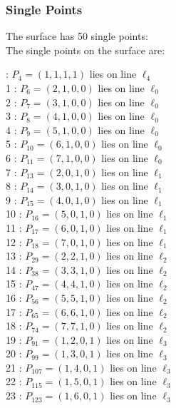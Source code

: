 \documentclass{article}
\begin{document}
{\subsubsection*{Single Points}
The surface has 50 single points:\\
The single points on the surface are:\\
\begin{multicols}{2}
 : $P_{4}=( 1, 1, 1, 1 )$ lies on line $\ell_{4}$\\
1 : $P_{6}=( 2, 1, 0, 0 )$ lies on line $\ell_{0}$\\
2 : $P_{7}=( 3, 1, 0, 0 )$ lies on line $\ell_{0}$\\
3 : $P_{8}=( 4, 1, 0, 0 )$ lies on line $\ell_{0}$\\
4 : $P_{9}=( 5, 1, 0, 0 )$ lies on line $\ell_{0}$\\
5 : $P_{10}=( 6, 1, 0, 0 )$ lies on line $\ell_{0}$\\
6 : $P_{11}=( 7, 1, 0, 0 )$ lies on line $\ell_{0}$\\
7 : $P_{13}=( 2, 0, 1, 0 )$ lies on line $\ell_{1}$\\
8 : $P_{14}=( 3, 0, 1, 0 )$ lies on line $\ell_{1}$\\
9 : $P_{15}=( 4, 0, 1, 0 )$ lies on line $\ell_{1}$\\
10 : $P_{16}=( 5, 0, 1, 0 )$ lies on line $\ell_{1}$\\
11 : $P_{17}=( 6, 0, 1, 0 )$ lies on line $\ell_{1}$\\
12 : $P_{18}=( 7, 0, 1, 0 )$ lies on line $\ell_{1}$\\
13 : $P_{29}=( 2, 2, 1, 0 )$ lies on line $\ell_{2}$\\
14 : $P_{38}=( 3, 3, 1, 0 )$ lies on line $\ell_{2}$\\
15 : $P_{47}=( 4, 4, 1, 0 )$ lies on line $\ell_{2}$\\
16 : $P_{56}=( 5, 5, 1, 0 )$ lies on line $\ell_{2}$\\
17 : $P_{65}=( 6, 6, 1, 0 )$ lies on line $\ell_{2}$\\
18 : $P_{74}=( 7, 7, 1, 0 )$ lies on line $\ell_{2}$\\
19 : $P_{91}=( 1, 2, 0, 1 )$ lies on line $\ell_{3}$\\
20 : $P_{99}=( 1, 3, 0, 1 )$ lies on line $\ell_{3}$\\
21 : $P_{107}=( 1, 4, 0, 1 )$ lies on line $\ell_{3}$\\
22 : $P_{115}=( 1, 5, 0, 1 )$ lies on line $\ell_{3}$\\
23 : $P_{123}=( 1, 6, 0, 1 )$ lies on line $\ell_{3}$\\

\end{multicols}}
\end{document}

